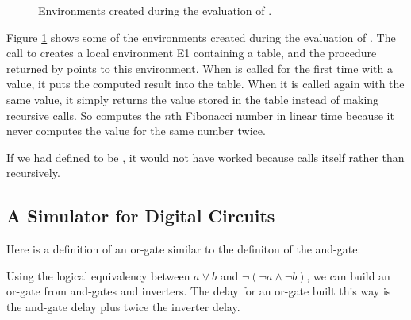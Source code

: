 \begin{exe}[3.27]
\begin{figure}
        \caption{Environments created during the evaluation of
        .}
        \label{3.27fig}
    \end{figure}
    Figure \ref{3.27fig} shows some of the environments created during the 
    evaluation of .
    The call to  creates a local environment E1 containing 
    a table, and the procedure returned by  points to this 
    environment. When  is called for the first time with a value, 
    it puts the computed result into the table. When it is called again with the 
    same value, it simply returns the value stored in the table instead of 
    making recursive calls. So  computes the $n$th Fibonacci 
    number in linear time because it never computes the value for the same 
    number twice.

    If we had defined  to be , it would not 
    have worked because  calls itself rather than  
    recursively.
\end{exe}

\subsection{A Simulator for Digital Circuits}

\begin{exe}[3.28]
    Here is a definition of an or-gate similar to the definiton of the and-gate:
\end{exe}

\begin{exe}[3.29]
    Using the logical equivalency between $a \lor b$ and $\lnot (\lnot a \land 
    \lnot b)$, we can build an or-gate from and-gates and inverters. The delay 
    for an or-gate built this way is the and-gate delay plus twice the inverter 
    delay.
\end{exe}

